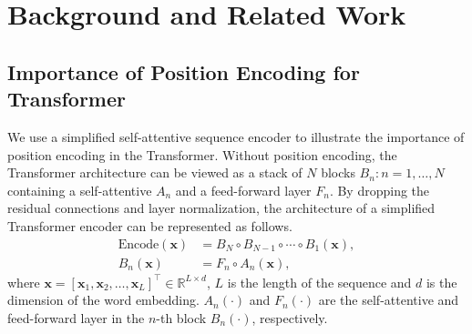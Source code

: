 \documentclass[11pt]{article}
\def\vx{{\bm{x}}}
\newcommand{\R}{\mathbb{R}}
\begin{document}
\section{Background and Related Work}
\label{sec:background}
\subsection{Importance of Position Encoding for Transformer}
\label{sec:importance}
We use a simplified self-attentive sequence encoder to illustrate the
importance of position encoding in the Transformer. Without position
encoding, the Transformer architecture can be viewed as a stack of $N$
blocks $B_n: n= 1,\ldots, N$ containing a self-attentive $A_n$ and a
feed-forward layer $F_n$. By dropping the residual connections and layer
normalization, the architecture of a simplified Transformer encoder can be
represented as follows.
\begin{align}
    \label{eq:simple-Transformer-encoder}
    \text{Encode}(\vx) &=B_{N}\circ B_{N-1}\circ\cdots \circ B_1(\vx), \\ 
    B_{n}(\vx)&= F_{n}\circ A_n\left(\vx\right) \label{eq:building-block},
\end{align}
where $\vx =[\vx_1,\vx_2,\dots,\vx_L]^\top \in \R^{L\times d}$, $L$ is the
length of the sequence and $d$ is the dimension of the word embedding.
$A_n(\cdot)$ and $F_n(\cdot)$ are the self-attentive and feed-forward layer in the $n$-th block $B_n(\cdot)$, respectively.
\end{document}
